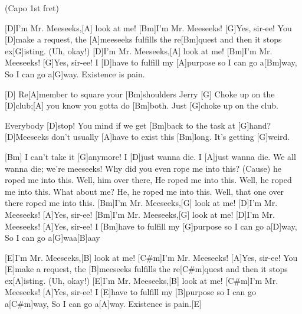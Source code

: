 
{\footnotesize(Capo 1st fret)}

\begin{guitar}
	[D]I'm Mr. Meeseeks,[A] look at me! [Bm]I'm Mr. Meeseeks! [G]Yes, sir-ee!
	You [D]make a request, the [A]meeseeks fulfills the re[Bm]quest and then it stops ex[G]isting. (Uh, okay!)
	[D]I'm Mr. Meeseeks,[A] look at me! [Bm]I'm Mr. Meeseeks! [G]Yes, sir-ee!
	I [D]have to fulfill my [A]purpose so I can go a[Bm]way,
	So I can go a[G]way. Existence is pain.
	
	[D] Re[A]member to square your [Bm]shoulders Jerry [G]{}
	Choke up on the [D]club;[A] you know you gotta do [Bm]both. Just [G]choke up on the club.
	
	 
	
	Everybody [D]stop! You mind if we get [Bm]back to the task at [G]hand? 
	[D]Meeseeks don't usually [A]have to exist this [Bm]long. It's getting [G]weird.
	
	 
	
	[Bm] I can't take it [G]anymore!
	I [D]just wanna die. I [A]just wanna die.
	We all wanna die; we're meeseeks! 
	Why did you even rope me into this?
	(Cause) he roped me into this. Well, him over there, 
	He roped me into this. Well, he roped me into this. 
	What about me? He, he roped me into this.
	Well, that one over there roped me into this.
	\pagebreak
	[Bm]I'm Mr. Meeseeks,[G] look at me! [D]I'm Mr. Meeseeks! [A]Yes, sir-ee!
	[Bm]I'm Mr. Meeseeks,[G] look at me! [D]I'm Mr. Meeseeks! [A]Yes, sir-ee!
	I [Bm]have to fulfill my [G]purpose so I can go a[D]way,
	So I can go a[G]waa[B]aay
	
	[E]I'm Mr. Meeseeks,[B] look at me! [C#m]I'm Mr. Meeseeks! [A]Yes, sir-ee!
	You [E]make a request, the [B]meeseeks fulfills the re[C#m]quest and then it stops ex[A]isting. (Uh, okay!)
	[E]I'm Mr. Meeseeks,[B] look at me! [C#m]I'm Mr. Meeseeks! [A]Yes, sir-ee!
	I [E]have to fulfill my [B]purpose so I can go a[C#m]way,
	So I can go a[A]way. Existence is pain.[E]{}
\end{guitar}